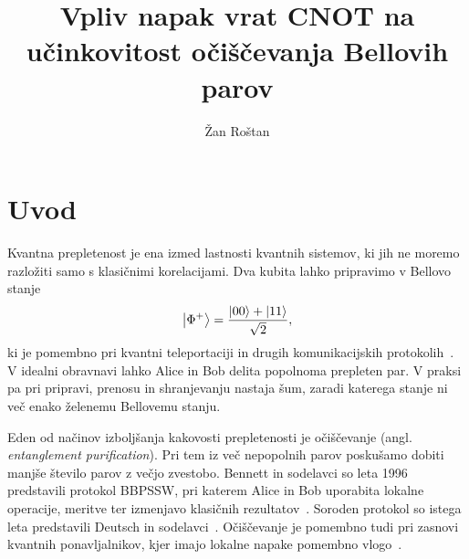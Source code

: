 
\graphicspath{{Skupina24/img/}}

\title{Vpliv napak vrat CNOT na učinkovitost očiščevanja Bellovih parov}
\author{Žan Roštan}
\maketitle


\section{Uvod}
\label{g24:sec:uvod}

Kvantna prepletenost je ena izmed lastnosti kvantnih sistemov, ki jih ne moremo razložiti samo s klasičnimi korelacijami. Dva kubita lahko pripravimo v Bellovo stanje
\begin{equation}
  \ket{\Phi^+}=\frac{\ket{00}+\ket{11}}{\sqrt{2}},
  \label{g24:eq:bell}
\end{equation}
ki je pomembno pri kvantni teleportaciji in drugih komunikacijskih protokolih~\cite{nielsen2010}. V idealni obravnavi lahko Alice in Bob delita popolnoma prepleten par. V praksi pa pri pripravi, prenosu in shranjevanju nastaja šum, zaradi katerega stanje ni več enako želenemu Bellovemu stanju.

Eden od načinov izboljšanja kakovosti prepletenosti je očiščevanje (angl. \emph{entanglement purification}). Pri tem iz več nepopolnih parov poskušamo dobiti manjše število parov z večjo zvestobo. Bennett in sodelavci so leta 1996 predstavili protokol BBPSSW, pri katerem Alice in Bob uporabita lokalne operacije, meritve ter izmenjavo klasičnih rezultatov~\cite{g24:bennett1996}. Soroden protokol so istega leta predstavili Deutsch in sodelavci~\cite{g24:deutsch1996}. Očiščevanje je pomembno tudi pri zasnovi kvantnih ponavljalnikov, kjer imajo lokalne napake pomembno vlogo~\cite{g24:briegel1998,g24:dur1999}.

